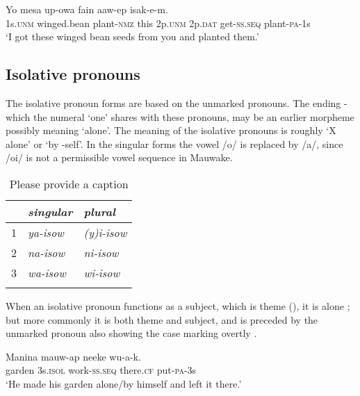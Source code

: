 \ea%
\label{ex:3:x596}
\gll Yo mesa up-owa fain   aaw-ep isak-e-m.\\
1s.\textsc{unm} winged.bean plant-\textsc{nmz} this 2p.\textsc{unm} 2p.\textsc{dat} get-\textsc{ss}.\textsc{seq} plant-\textsc{pa}-1s\\
\glt`I got these winged bean seeds from you and planted them.'
\z

\subsection{Isolative pronouns}
{}
The isolative pronoun forms are based on the unmarked pronouns. The ending \nobreakdash-\textstyleStyleVernacularWordsItalic{,} which the numeral  `one' shares with these pronouns, may be an earlier morpheme possibly meaning `alone'. The meaning of the isolative pronouns is roughly `X alone' or `by -self'. In the singular forms the vowel /o/ is replaced by /a/, since /oi/ is not a permissible vowel sequence in Mauwake. 

\begin{table}
\caption{Please provide a caption}
 
\begin{tabular}{l>{\itshape}l>{\itshape}l}
\mytoprule
&\upshape singular &\upshape plural\\
\midrule
1 &ya-isow &(y)i-isow\\
2 &na-isow &ni-isow\\
3 &wa-isow &wi-isow\\
\mybottomrule
\end{tabular}
\end{table}


When an isolative pronoun functions as a subject, which is  theme (), it is alone ; but more commonly it is both theme and subject, and is preceded by the unmarked pronoun also showing the case marking overtly . 

\ea%
\label{ex:3:x599}
\gll Manina  mauw-ap neeke wu-a-k. \\
garden 3s.\textsc{isol} work-\textsc{ss}.\textsc{seq} there.\textsc{cf} put-\textsc{pa}-3s\\
\glt`He made his garden alone/by himself and left it there.'
\z

